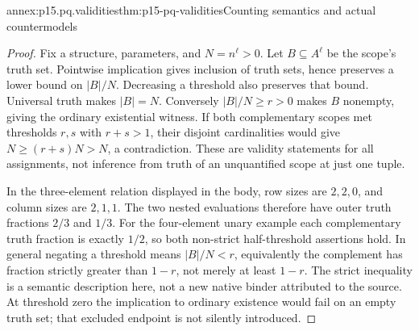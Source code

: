 \begin{annexitem}{annex:p15.pq.validities}{thm:p15-pq-validities}{Counting semantics and actual countermodels}
\begin{proof}
Fix a structure, parameters, and \(N=n^\ell>0\).
Let \(B\subseteq A^\ell\) be the scope's truth set. Pointwise implication
gives inclusion of truth sets, hence preserves a lower bound on
\(|B|/N\). Decreasing a threshold also preserves that bound.
Universal truth makes \(|B|=N\). Conversely \(|B|/N\ge r>0\)
makes \(B\) nonempty, giving the ordinary existential witness.
If both complementary scopes met thresholds \(r,s\) with \(r+s>1\),
their disjoint cardinalities would give \(N\ge(r+s)N>N\), a contradiction.
These are validity statements for all assignments, not inference from
truth of an unquantified scope at just one tuple.

In the three-element relation displayed in the body, row sizes are
\(2,2,0\), and column sizes are \(2,1,1\). The two nested evaluations
therefore have outer truth fractions \(2/3\) and \(1/3\).
For the four-element unary example each complementary truth fraction
is exactly \(1/2\), so both non-strict half-threshold assertions hold.
In general negating a threshold means \(|B|/N<r\), equivalently
the complement has fraction strictly greater than \(1-r\), not merely
at least \(1-r\). The strict inequality is a semantic description here,
not a new native binder attributed to the source.
At threshold zero the implication to ordinary existence would fail on
an empty truth set; that excluded endpoint is not silently introduced.
\end{proof}
\end{annexitem}

